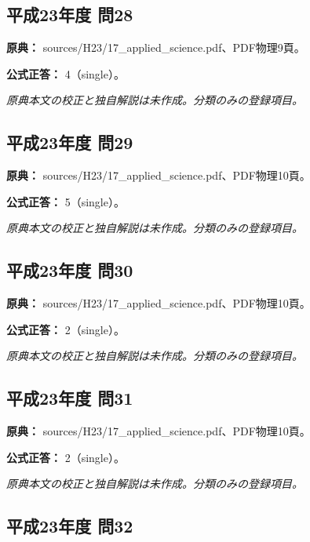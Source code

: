 \subsection{平成23年度 問28}
\label{q:h23-reg-applied-28}

\noindent\textbf{原典：} sources/H23/17\_applied\_science.pdf、PDF物理9頁。

\textbf{公式正答：} 4（single）。

\par\textit{原典本文の校正と独自解説は未作成。分類のみの登録項目。}

\subsection{平成23年度 問29}
\label{q:h23-reg-applied-29}

\noindent\textbf{原典：} sources/H23/17\_applied\_science.pdf、PDF物理10頁。

\textbf{公式正答：} 5（single）。

\par\textit{原典本文の校正と独自解説は未作成。分類のみの登録項目。}

\subsection{平成23年度 問30}
\label{q:h23-reg-applied-30}

\noindent\textbf{原典：} sources/H23/17\_applied\_science.pdf、PDF物理10頁。

\textbf{公式正答：} 2（single）。

\par\textit{原典本文の校正と独自解説は未作成。分類のみの登録項目。}

\subsection{平成23年度 問31}
\label{q:h23-reg-applied-31}

\noindent\textbf{原典：} sources/H23/17\_applied\_science.pdf、PDF物理10頁。

\textbf{公式正答：} 2（single）。

\par\textit{原典本文の校正と独自解説は未作成。分類のみの登録項目。}

\subsection{平成23年度 問32}
\label{q:h23-reg-applied-32}

